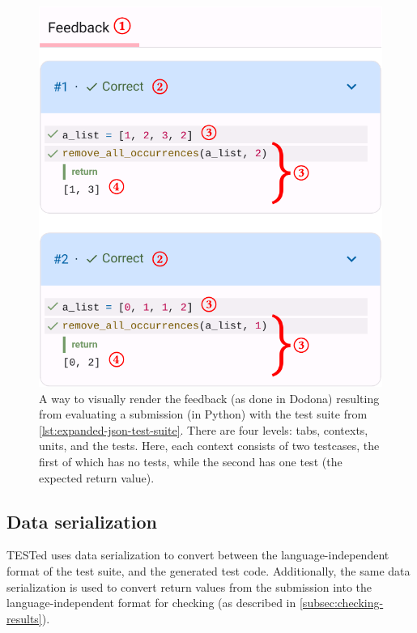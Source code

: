 \documentclass[../main]{subfiles}
\begin{document}
\begin{figure}
    \centering
    \includegraphics[scale=0.4]{dodona-rendering}
    \caption{A way to visually render the feedback (as done in Dodona) resulting from evaluating a submission (in Python) with the test suite from \cref{lst:expanded-json-test-suite}. There are four levels:  tabs,  contexts,  units, and  the tests. Here, each context consists of two testcases, the first of which has no tests, while the second has one test (the expected return value).}
    \label{fig:dodona}
\end{figure}

\subsection{Data serialization}\label{subsec:data-serialization}

TESTed uses data serialization to convert between the language-independent format of the test suite, and the generated test code.
Additionally, the same data serialization is used to convert return values from the submission into the language-independent format for checking (as described in \cref{subsec:checking-results}).
\end{document}
